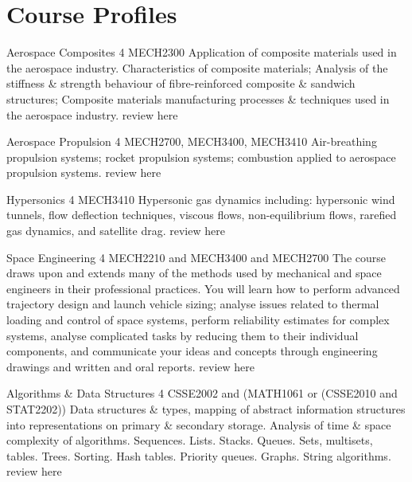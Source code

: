 \chapter{Course Profiles}



	{Aerospace Composites}
	{4}
	{MECH2300}
	{}
	{}
	{Application of composite materials used in the aerospace industry. Characteristics of composite materials; Analysis of the stiffness \& strength behaviour of fibre-reinforced composite \& sandwich structures; Composite materials manufacturing processes \& techniques used in the aerospace industry.}
	{review here}

	{Aerospace Propulsion}
	{4}
	{MECH2700, MECH3400, MECH3410}
	{}
	{}
	{Air-breathing propulsion systems; rocket propulsion systems; combustion applied to aerospace propulsion systems.}
	{review here}

	{Hypersonics}
	{4}
	{MECH3410}
	{}
	{}
	{Hypersonic gas dynamics including: hypersonic wind tunnels, flow deflection techniques, viscous flows, non-equilibrium flows, rarefied gas dynamics, and satellite drag.}
	{review here}

	{Space Engineering}
	{4}
	{MECH2210 and MECH3400 and MECH2700}
	{}
	{}
	{The course draws upon and extends many of the methods used by mechanical and space engineers in their professional practices. You will learn how to perform advanced trajectory design and launch vehicle sizing; analyse issues related to thermal loading and control of space systems, perform reliability estimates for complex systems, analyse complicated tasks by reducing them to their individual components, and communicate your ideas and concepts through engineering drawings and written and oral reports.}
	{review here}

	{Algorithms \& Data Structures}
	{4}
	{CSSE2002 and (MATH1061 or (CSSE2010 and STAT2202))}
	{}
	{}
	{Data structures \& types, mapping of abstract information structures into representations on primary \& secondary storage. Analysis of time \& space complexity of algorithms. Sequences. Lists. Stacks. Queues. Sets, multisets, tables. Trees. Sorting. Hash tables. Priority queues. Graphs. String algorithms.}
	{review here}

